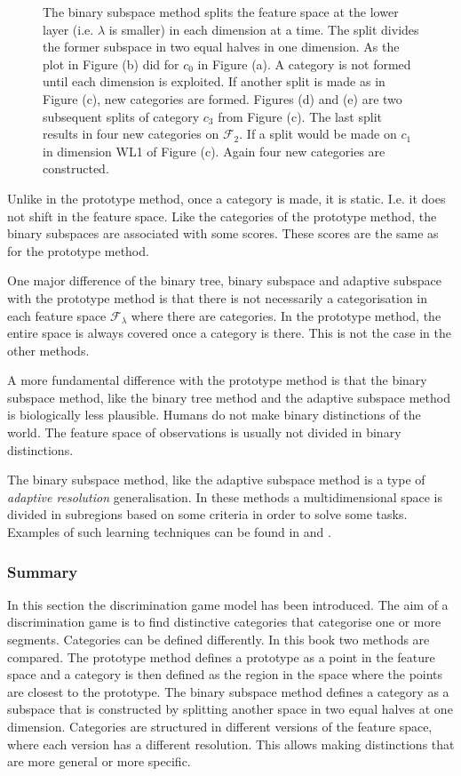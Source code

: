 \begin{figure}
\caption{The binary subspace method splits the feature space at the lower layer (i.e. $\lambda$ is smaller) in each dimension at a time. The split divides the former subspace in two equal halves in one dimension. As the plot in Figure (b) did for $c_0$ in Figure (a). A category is not formed until each dimension is exploited. If another split is made as in Figure (c), new categories are formed. Figures (d) and (e) are two subsequent splits of category $c_3$ from Figure (c). The last split results in four new categories on ${\mathcal F}_2$. If a split would be made on $c_1$ in dimension WL1 of Figure (c). Again four new categories are constructed.}
\label{f:lg:subspace}
\end{figure}


Unlike in the prototype method, once a category is made, it is static. I.e. it does not shift in the feature space. Like the categories of the prototype method, the binary subspaces are associated with some scores. These scores are the same as for the prototype method. 

One major difference of the binary tree, binary subspace and adaptive subspace with the prototype method is that there is not necessarily a categorisation in each feature space ${\mathcal F}_\lambda$ where there are categories. In the prototype method, the entire space is always covered once a category is there. This is not the case in the other methods. 

A more fundamental difference with the prototype method is that the binary subspace method, like the binary tree method and the adaptive subspace method is biologically less plausible. Humans do not make binary distinctions of the world. The feature space of observations is usually not divided in binary distinctions.


The binary subspace method, like the adaptive subspace method \citep{dejong:2000} is a type of {\em adaptive resolution} generalisation. In these methods a multidimensional space is divided in subregions based on some criteria in order to solve some tasks. Examples of such learning techniques can be found in \citealt{chapmankaebling:1991} and \citealt{moore:1995}.

\subsubsection{Summary}

In this section the discrimination game model has been introduced. The aim of a discrimination game is to find distinctive categories that categorise one or more segments. Categories can be defined differently. In this book two methods are compared. The prototype method defines a prototype as a point in the feature space and a category is then defined as the region in the space where the points are closest to the prototype. The binary subspace method defines a category as a subspace that is constructed by splitting another space in two equal halves at one dimension. Categories are structured in different versions of the feature space, where each version has a different resolution. This allows making distinctions that are more general or more specific. 

